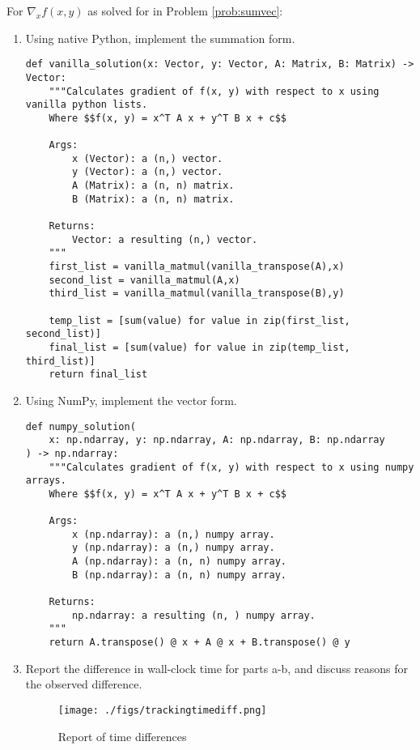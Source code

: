\documentclass{article}
\begin{document}
\begin{aprob} \label{prob:sumvecimp}
    For $\nabla_x f(x,y)$ as solved for in Problem \ref{prob:sumvec}:
    \begin{enumerate}
        \item {} Using native Python, implement the summation form.

\begin{lstlisting}
def vanilla_solution(x: Vector, y: Vector, A: Matrix, B: Matrix) -> Vector:
    """Calculates gradient of f(x, y) with respect to x using vanilla python lists.
    Where $$f(x, y) = x^T A x + y^T B x + c$$

    Args:
        x (Vector): a (n,) vector.
        y (Vector): a (n,) vector.
        A (Matrix): a (n, n) matrix.
        B (Matrix): a (n, n) matrix.

    Returns:
        Vector: a resulting (n,) vector.
    """
    first_list = vanilla_matmul(vanilla_transpose(A),x)
    second_list = vanilla_matmul(A,x)
    third_list = vanilla_matmul(vanilla_transpose(B),y)

    temp_list = [sum(value) for value in zip(first_list, second_list)]
    final_list = [sum(value) for value in zip(temp_list, third_list)]
    return final_list
\end{lstlisting}

        \item {} Using NumPy, implement the vector form.

\begin{lstlisting}
def numpy_solution(
    x: np.ndarray, y: np.ndarray, A: np.ndarray, B: np.ndarray
) -> np.ndarray:
    """Calculates gradient of f(x, y) with respect to x using numpy arrays.
    Where $$f(x, y) = x^T A x + y^T B x + c$$

    Args:
        x (np.ndarray): a (n,) numpy array.
        y (np.ndarray): a (n,) numpy array.
        A (np.ndarray): a (n, n) numpy array.
        B (np.ndarray): a (n, n) numpy array.

    Returns:
        np.ndarray: a resulting (n, ) numpy array.
    """
    return A.transpose() @ x + A @ x + B.transpose() @ y
\end{lstlisting}

        \item {} Report the difference in wall-clock time for parts a-b, and discuss reasons for the observed difference. 

\begin{figure}[htp] 
    \centering
    \vspace*{-0.1in}
    \texttt{[image: ./figs/trackingtimediff.png]}
    \caption{Report of time differences}
    \label{figs:time_diff.png}
\end{figure}


\end{enumerate}
\end{aprob}
\end{document}
